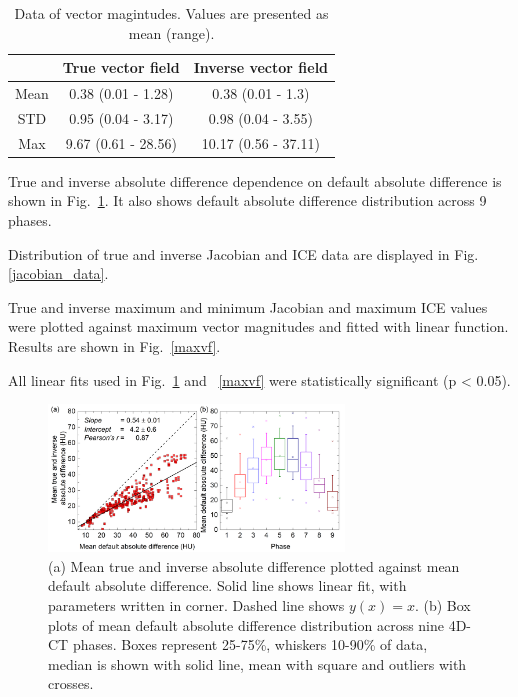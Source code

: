 \documentclass[type=dr, dr=rernat, accentcolor=tud7b,colorbacktitle, bigchapter, openright, twoside, 12pt ]{tudthesis}
\begin{document}
\begin{table}[H]
  \centering
  \caption{Data of vector magintudes. Values are presented as mean (range).}
  \begin{tabular}{c|c|c}
  
       & True vector field & Inverse vector field  \\
       \hline
       Mean & 0.38 (0.01 - 1.28) & 0.38 (0.01 - 1.3) \\ 
       STD & 0.95 (0.04 - 3.17) & 0.98 (0.04 - 3.55) \\ 
       Max & 9.67 (0.61 - 28.56) & 10.17 (0.56 - 37.11) \\
    \hline\hline
  \end{tabular}
  \label{tab:vectordata_lung}
\end{table}

True and inverse absolute difference dependence on default absolute difference is shown in Fig.~\ref{absDiff_lung}. It also shows default absolute difference distribution across 9 phases. 

Distribution of true and inverse Jacobian and ICE data are displayed in Fig. \ref{jacobian_data}. 

True and inverse maximum and minimum Jacobian and maximum ICE values were plotted against maximum vector magnitudes and fitted with linear function. Results are shown in Fig.~\ref{maxvf}.

All linear fits used in Fig.~\ref{absDiff_lung} and ~\ref{maxvf} were statistically significant (p < 0.05).


\begin{figure}[H]
	\begin{center}		
		\includegraphics[width=0.7\textwidth]{./Images/absDiff.png}
		\caption{(a) Mean true and inverse absolute difference plotted against mean default absolute difference. Solid line shows linear fit, with parameters
		written in corner. Dashed line shows $y(x)=x$. (b) Box plots of mean default absolute difference distribution across nine 4D-CT phases. Boxes represent 25-75\%, whiskers 10-90\%
		of data, median is shown with solid line, mean with square and outliers with crosses.}
		\label{absDiff_lung}
	\end{center}
\end{figure}
\end{document}
